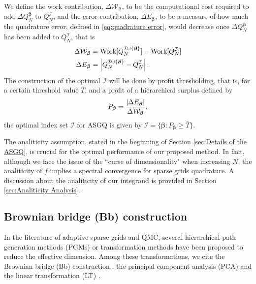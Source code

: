 We define the work contribution, $\Delta \mathcal{W}_{\boldsymbol{\beta}}$, to be the computational cost  required to add  $\Delta Q_N^{\boldsymbol{\beta}}$ to $Q^{\mathcal{I}}_N$, and the error contribution, $\Delta E_{\boldsymbol{\beta}}$, to be  a measure of how much the quadrature error, defined in \eqref{eq:quadrature error}, would decrease once $\Delta Q_N^{\boldsymbol{\beta}}$  has been added to  $Q^{\mathcal{I}}_N$, that is 
\begin{align}\label{eq:Work_error_contributions}
\Delta \mathcal{W}_{\boldsymbol{\beta}} &= \text{Work}[Q^{\mathcal{I} \cup \{\boldsymbol{\beta}\}}_N]-\text{Work}[Q^{\mathcal{I}}_N] \nonumber\\
\Delta E_{\boldsymbol{\beta}} &= \left\lvert Q^{\mathcal{I} \cup \{\boldsymbol{\beta}\}}_N-Q^{\mathcal{I}}_N\right\rvert.
\end{align}
 The  construction of the optimal  $\mathcal{I}$ will be done by profit thresholding, that is, for a certain threshold value $\bar{T}$, and a profit of a hierarchical surplus defined by
 \begin{equation*}
 P_{\boldsymbol{\beta}}= \frac{\left\lvert\Delta E_{\boldsymbol{\beta}}\right\rvert}{\Delta\mathcal{W}_{\boldsymbol{\beta}}},
 \end{equation*}
  the optimal index set  $\mathcal{I}$  for ASGQ  is given by 
 $\mathcal{I}=\{\boldsymbol{\beta}: P_{\boldsymbol{\beta}}	 \ge \bar{T}\}$.
 
\begin{remark}
The analiticity assumption, stated in the beginning of Section \ref{sec:Details of the ASGQ}, is crucial for the optimal performance of our proposed method. In fact, although we face the issue of the  ``curse of dimensionality" when increasing $N$, the analiticity of $f$ implies a spectral convergence for sparse grids quadrature. A discussion about the analiticity of our integrand is provided in Section \ref{sec:Analiticity Analysis}.
\end{remark}  
 
\subsection{Brownian bridge (Bb) construction}\label{sec:Brwonian bridge construction}
In the literature of adaptive sparse grids and  QMC, several hierarchical path generation methods (PGMs) or transformation methods have been proposed to reduce the effective dimension. Among these transformations, we cite  the Brownian bridge (Bb)  construction \cite{morokoff1994quasi,moskowitz1996smoothness,caflisch1997valuation}, the principal component analysis (PCA)  \cite{acworth1998comparison} and the linear transformation (LT) \cite{imai2004minimizing}.

